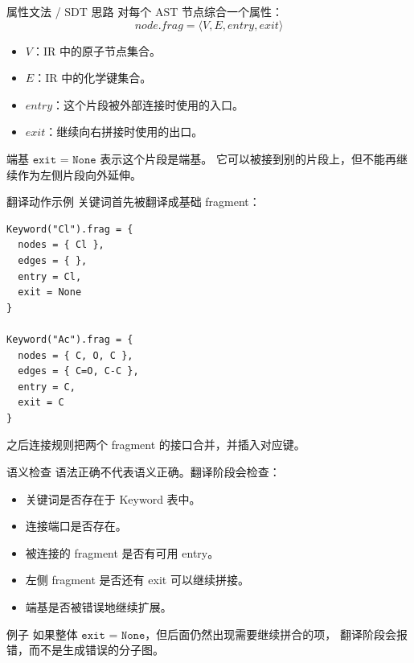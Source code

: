 \documentclass{beamer}
\begin{document}
\begin{frame}{属性文法 / SDT 思路}
    对每个 AST 节点综合一个属性：
    \[
        node.frag = \langle V, E, entry, exit \rangle
    \]

    \begin{itemize}
        \item \(V\)：IR 中的原子节点集合。
        \item \(E\)：IR 中的化学键集合。
        \item \(entry\)：这个片段被外部连接时使用的入口。
        \item \(exit\)：继续向右拼接时使用的出口。
    \end{itemize}

    \vspace{0.5em}
    \begin{block}{端基}
        \(\texttt{exit = None}\) 表示这个片段是端基。
        它可以被接到别的片段上，但不能再继续作为左侧片段向外延伸。
    \end{block}
\end{frame}

\begin{frame}[fragile]{翻译动作示例}
    关键词首先被翻译成基础 fragment：
    \begin{lstlisting}
Keyword("Cl").frag = {
  nodes = { Cl },
  edges = { },
  entry = Cl,
  exit = None
}

Keyword("Ac").frag = {
  nodes = { C, O, C },
  edges = { C=O, C-C },
  entry = C,
  exit = C
}
    \end{lstlisting}

    \vspace{0.5em}
    之后连接规则把两个 fragment 的接口合并，并插入对应键。
\end{frame}

\begin{frame}{语义检查}
    语法正确不代表语义正确。翻译阶段会检查：
    \begin{itemize}
        \item 关键词是否存在于 Keyword 表中。
        \item 连接端口是否存在。
        \item 被连接的 fragment 是否有可用 entry。
        \item 左侧 fragment 是否还有 exit 可以继续拼接。
        \item 端基是否被错误地继续扩展。
    \end{itemize}

    \vspace{0.5em}
    \begin{block}{例子}
        如果整体 \(\texttt{exit = None}\)，但后面仍然出现需要继续拼合的项，
        翻译阶段会报错，而不是生成错误的分子图。
    \end{block}
\end{frame}
\end{document}
